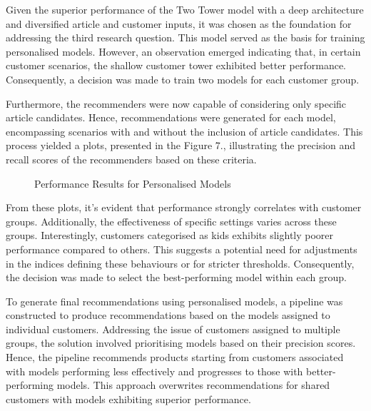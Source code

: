 \documentclass[conference,compsoc]{IEEEtran}
\begin{document}
Given the superior performance of the Two Tower model with a deep architecture and diversified article and customer inputs, it was chosen as the foundation for addressing the third research question. This model served as the basis for training personalised models. However, an observation emerged indicating that, in certain customer scenarios, the shallow customer tower exhibited better performance. Consequently, a decision was made to train two models for each customer group.

Furthermore, the recommenders were now capable of considering only specific article candidates. Hence, recommendations were generated for each model, encompassing scenarios with and without the inclusion of article candidates. This process yielded a plots, presented in the Figure 7., illustrating the precision and recall scores of the recommenders based on these criteria.
\begin{figure}[htbp]
    \centering
    \caption{Performance Results for Personalised Models}
    \label{fig:example}
\end{figure}

From these plots, it's evident that performance strongly correlates with customer groups. Additionally, the effectiveness of specific settings varies across these groups. Interestingly, customers categorised as kids exhibits slightly poorer performance compared to others. This suggests a potential need for adjustments in the indices defining these behaviours or for stricter thresholds. Consequently, the decision was made to select the best-performing model within each group.

To generate final recommendations using personalised models, a pipeline was constructed to produce recommendations based on the models assigned to individual customers. Addressing the issue of customers assigned to multiple groups, the solution involved prioritising models based on their precision scores. Hence, the pipeline recommends products starting from customers associated with models performing less effectively and progresses to those with better-performing models. This approach overwrites recommendations for shared customers with models exhibiting superior performance.
\end{document}
